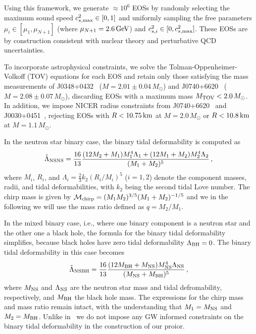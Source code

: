 \documentclass[twocolumn]{aastex631}
\begin{document}
Using this framework, we generate $\approx 10^6$ EOSs by randomly selecting the maximum sound speed $c_{s,{\rm max}}^2 \in [0,1]$ and uniformly sampling the free parameters $\mu_i \in [\mu_1, \mu_{N+1}]$ (where $\mu_{N+1} = 2.6\,\rm GeV$) and $c_{s,i}^2 \in [0, c_{s,{\rm max}}^2]$.
These EOSs are by construction consistent with nuclear theory and perturbative QCD uncertainties.

To incorporate astrophysical constraints, we solve the Tolman-Oppenheimer-Volkoff (TOV) equations for each EOS and retain only those satisfying the mass measurements of J0348+0432~\citep{Antoniadis2013} ($M = 2.01\pm 0.04\,M_{\odot}$) and J0740+6620~\citep{Cromartie2019, Fonseca2021} ($M = 2.08 \pm 0.07\,M_{\odot}$), discarding EOSs with a maximum mass $M_{\rm TOV} < 2.0\,M_{\odot}$. 
In addition, we impose NICER radius constraints from J0740+6620~\citep{Miller2021, Riley2021} and J0030+0451~\citep{Riley2019, MCMiller2019b}, rejecting EOSs with $R < 10.75\,\rm km$ at $M = 2.0\,M_{\odot}$ or $R < 10.8\,\rm km$ at $M = 1.1\,M_{\odot}$.
	
In the neutron star binary case, the binary tidal deformability is computed as
\begin{equation} 
 \tilde{\Lambda}_{\rm NSNS} = \frac{16}{13} \frac{ (12M_2 + M_1) M_1^4 \Lambda_1 + (12M_1 + M_2) M_2^4 \Lambda_2}{(M_1 + M_2)^5}\,,
\end{equation}
where $M_i$, $R_i$, and $\Lambda_i = \frac{2}{3} k_2 \left( R_i/M_i \right)^5$ ($i=1,2$) denote the component masses, radii, and tidal deformabilities, with $k_2$ being the second tidal Love number.
The chirp mass is given by $\mathcal{M}_{\rm chirp} = (M_1 M_2)^{3/5} (M_1+M_2)^{-1/5}$ and we in the following we will use the mass ratio defined as $q = M_2/M_1$.
	
In the mixed binary case, i.e., where one binary component is a neutron star and the other one a black hole, the formula for the binary tidal deformability simplifies, because black holes have zero tidal deformability $\Lambda_{\rm BH}=0$.
The binary tidal deformability in this case becomes
\begin{equation} 
 \tilde{\Lambda}_{\rm NSBH} = \frac{16}{13} \frac{ (12M_{\rm BH} + M_{\rm NS}) M_{\rm NS}^4 \Lambda_{\rm NS}}{(M_{\rm NS} + M_{\rm BH})^5}\,,
 \end{equation}
where $M_{\rm NS}$ and $\Lambda_{\rm NS}$ are the neutron star mass and tidal defromability, respectively, and $M_{\rm BH}$ the black hole mass. 
The expressions for the chirp mass and mass ratio remain intact, with the understanding that $M_1=M_{\rm NS}$ and $M_2=M_{\rm BH}$. 
Unlike in~\citet{altiparmak22,Ecker:2022dlg} we do not impose any GW informed constraints on the binary tidal deformability in the construction of our proior.
	
\end{document}
